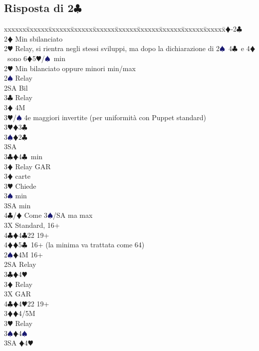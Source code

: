 \documentclass[a4paper,italian]{article}
\newcommand{\BC}{\textcolor{OliveGreen}{$\clubsuit$}}
\newcommand{\BD}{\textcolor{RedOrange}{$\vardiamondsuit$}}
\newcommand{\BH}{\textcolor{Red2}{$\varheartsuit${}}}
\newcommand{\BS}{\textcolor{MidnightBlue}{$\spadesuit${}}}
\newcommand{\pdfc}{\texorpdfstring{\BC{}}{C}}
\newenvironment{bidtable}
{\begin{tabbing}

    xxxxxx\=xxxxxx\=xxxxxx\=xxxxxx\=xxxxxx\=xxxxxx\=xxxxxx\=xxxxxx\=xxxxxx\=xxxxxx\=\kill}
{\end{tabbing} }%
\begin{document}
\newpage

\subsection{Risposta di 2\pdfc}

\begin{bidtable}
    1\BD-2\BC\+\\
    2\BD \> Min sbilanciato\+\\
    2\BH \> Relay, si rientra negli stessi sviluppi, ma dopo la dichiarazione di 2\BS\ 4\BC\ e 4\BD\ sono 6\BD 5\BH /\BS\ min\-\\
    2\BH \> Min bilanciato oppure minori min/max\+\\
    2\BS \> Relay\+\\
    2SA \> Bil\+\\
    3\BC \> Relay\+\\
    3\BD \> 4M\+\\
    3\BH/\BS \> 4e maggiori invertite (per uniformità con Puppet standard)\-\\
    3\BH {}\BD 3\BC \\
    3\BS {}\BD 2\BC \\
    3SA \-\-\\
    3\BC {}\BD 4\BC\ min\+\\
    3\BD \> Relay GAR\-\\
    3\BD {} carte\+\\
    3\BH \> Chiede\+\\
    3\BS {} min\\
    3SA  min\\
    4\BC/\BD \> Come 3\BS /SA ma max\-\-\\
    3X \> Standard, 16+\\
    4\BC {}\BD 4\BC 22 19+\\
    4\BD {}\BD 5\BC\ 16+ (la minima va trattata come 64)\-\-\\
    2\BS {}\BD 4M 16+\+\\
    2SA \> Relay\+\\
    3\BC {}\BD 4\BH \+\\
    3\BD \> Relay\+\\
    3X \> GAR\\
    4\BC {}\BD 4\BH 22 19+\-\-\\
    3\BD {}\BD 4/5M\+\\
    3\BH \> Relay\+\\
    3\BS {}\BD 4\BS \\
    3SA \BD 4\BH \\

\end{bidtable}
\end{document}
